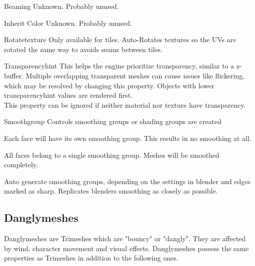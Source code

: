 \begin{propertyAurora}{Beaming}
Unknown. Probably unused.
\end{propertyAurora}

\begin{propertyAurora}{Inherit Color}
Unknown. Probably unused.
\end{propertyAurora}

\begin{propertyAurora}{Rotatetexture}
Only available for tiles. Auto-Rotates textures so the UVs are rotated
the same way to avoids seams between tiles.
\end{propertyAurora}

\begin{propertyAurora}{Transparencyhint}
This helps the engine prioritize transparency, similar to a z-buffer.
Multiple overlapping transparent meshes can cause issues like
flickering, which may be resolved by changing this property. Objects 
with lower transparencyhint values are rendered first.\\

This property can be ignored if neither material nor texture have transparency.
\end{propertyAurora}

\begin{propertyAurora}{Smoothgroup}
Controls smoothing groups or shading groups are created
\begin{description}[leftmargin=6em,style=nextline]
    \item[Separate] Each face will have its own smoothing group. This results in no smoothing at all.
    \item[Single] All faces belong to a single smoothing group. Meshes will be smoothed completely.
    \item[Auto] Auto generate smoothing groups, depending on the settings in blender and edges marked as sharp. Replicates blenders smoothing as closely as possible.
\end{description}
\end{propertyAurora}

\subsection{Danglymeshes}
Danglymeshes are Trimeshes which are "bouncy" or "dangly". They are affected by
wind, character movement and visual effects. Danglymeshes possess the same 
properties as Trimeshes in addition to the following ones.

